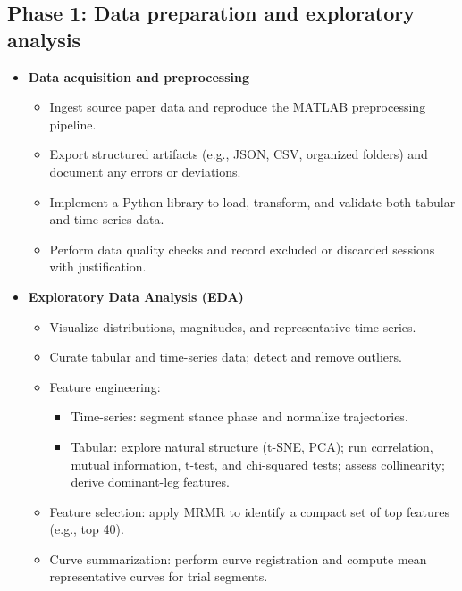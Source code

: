 \subsection{Phase 1: Data preparation and exploratory analysis}
\begin{itemize}
    \item \textbf{Data acquisition and preprocessing}
    \begin{itemize}
        \item Ingest source paper data and reproduce the MATLAB preprocessing pipeline.
        \item Export structured artifacts (e.g., JSON, CSV, organized folders) and document any errors or deviations.
        \item Implement a Python library to load, transform, and validate both tabular and time-series data.
        \item Perform data quality checks and record excluded or discarded sessions with justification.
    \end{itemize}
    \item \textbf{Exploratory Data Analysis (EDA)}
    \begin{itemize}
        \item Visualize distributions, magnitudes, and representative time-series.
        \item Curate tabular and time-series data; detect and remove outliers.
        \item Feature engineering:
        \begin{itemize}
            \item Time-series: segment stance phase and normalize trajectories.
            \item Tabular: explore natural structure (t-SNE, PCA); run correlation, mutual information, t-test, and chi-squared tests; assess collinearity; derive dominant-leg features.
        \end{itemize}
        \item Feature selection: apply MRMR to identify a compact set of top features (e.g., top 40).
        \item Curve summarization: perform curve registration and compute mean representative curves for trial segments.
    \end{itemize}
\end{itemize}

